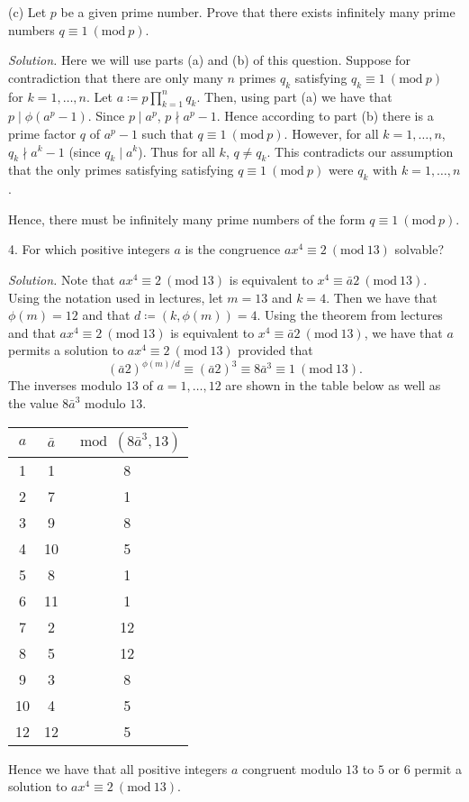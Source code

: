 \documentclass{article}
\newcommand{\Mod}[1]{\ (\mathrm{mod}\ #1)}
\begin{document}
\vspace{5mm}

(c) Let $p$ be a given prime number. Prove that there exists infinitely
many prime numbers $q \equiv 1 \Mod{p}$.

\textit{Solution.}
Here we will use parts (a) and (b) of this question. Suppose for contradiction
that there are only many $n$ primes $q_k$ satisfying $q_k \equiv 1 \Mod{p}$
for $k = 1, \ldots, n$. Let $a \coloneqq p \prod_{k = 1}^n q_k$. Then, using part (a)
we have that $p \mid \phi(a^p - 1)$. Since $p \mid a^p$, $p \nmid a^p - 1$.
Hence according to part (b) there is a prime factor $q$ of $a^p - 1$
such that $q \equiv 1 \Mod{p}$. However, for all $k = 1, \ldots, n$, $q_k \nmid a^k - 1$
(since $q_k \mid a^k$). Thus for all $k$, $q \neq q_k$. This contradicts our assumption
that the only primes satisfying satisfying $q \equiv 1 \Mod{p}$
were $q_k$ with $k = 1, \ldots, n$.

Hence, there must be infinitely many prime numbers of the form $q \equiv 1 \Mod{p}$.
\newpage

4. For which positive integers $a$ is the congruence
$a x^4 \equiv 2 \Mod{13}$ solvable?

\textit{Solution.}
Note that $a x^4 \equiv 2 \Mod{13}$ is equivalent to
$x^4 \equiv \bar{a} 2 \Mod{13}$. Using the notation used in lectures,
let $m = 13$ and $k = 4$.
Then we have that $\phi(m) = 12$ and that $d \coloneqq (k, \phi(m)) =  4$.
Using the theorem from lectures and that
$a x^4 \equiv 2 \Mod{13}$ is equivalent to
$x^4 \equiv \bar{a} 2 \Mod{13}$, we have that $a$ permits a solution to
$a x^4 \equiv 2 \Mod{13}$ provided that
%
\begin{equation*}
    (\bar{a} 2)^{\phi(m) / d} \equiv (\bar{a} 2)^3 \equiv 8 \bar{a}^3 \equiv 1 \Mod{13}
    .
\end{equation*}
%
The inverses modulo $13$ of $a = 1, \ldots, 12$ are shown in the table below
as well as the value $8 \bar{a}^3$ modulo $13$.

\begin{table}[!ht]
\centering
\begin{tabular}{| c | c | c |}
 \hline
 $a$ & $\bar{a}$ & $\bmod(8 \bar{a}^3, 13)$ \\
 \hline
 1 & 1 & 8 \\
 2 & 7 & 1 \\
 3 & 9 & 8 \\
 4 & 10 & 5 \\
 5 & 8 & 1 \\
 6 & 11 & 1 \\
 7 & 2 & 12 \\
 8 & 5 & 12 \\
 9 & 3 & 8\\
 10 & 4 & 5 \\
 12 & 12 & 5 \\
 \hline
\end{tabular}
\end{table}

Hence we have that all positive integers $a$ congruent modulo $13$ to $5$ or $6$
permit a solution to $a x^4 \equiv 2 \Mod{13}$.
\end{document}

